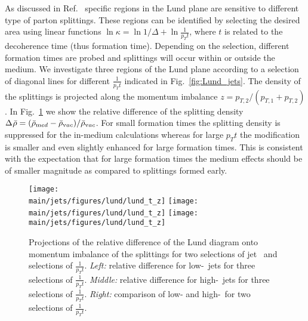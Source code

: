 
As discussed in Ref.~\cite{Andrews:2018jcm} specific regions in the Lund plane are sensitive to different type of parton splittings. 
These regions can be identified by selecting the desired area using linear functions $\ln\kappa = \ln1/\Delta + \ln \frac{1}{p_{T} t}$, where $t$ is related to the decoherence time (thus formation time).
Depending on the selection, different formation times are probed and splittings will occur within or outside the medium.
We investigate three regions of the Lund plane according to a selection of diagonal lines for different $\frac{1}{p_{T} t}$ indicated in Fig.~\ref{fig:Lund_jets}.
The density of the splittings is projected along the momentum imbalance $z = p_{T,2}/(p_{T,1} + p_{T,2})$.
In Fig.~\ref{fig:Lund_projections_z} we show the relative difference of the splitting density $\Delta_{\rm}\bar{\rho} = (\bar{\rho}_{\mathrm med} - \bar{\rho}_{\mathrm vac})/\bar{\rho}_{\mathrm vac}$.
For small formation times the splitting density is suppressed for the in-medium calculations whereas for large $p_{T} t$ the modification is smaller and even slightly enhanced for large formation times.
This is consistent with the expectation that for large formation times the medium effects should be of smaller magnitude as compared to splittings formed early.
%
\begin{figure}[htbp]
	\centering
	\texttt{[image: \\main/jets/figures/lund/lund\_t\_z]}
	\texttt{[image: \\main/jets/figures/lund/lund\_t\_z]}
	\texttt{[image: \\main/jets/figures/lund/lund\_t\_z]}
	\caption{Projections of the relative difference of the Lund diagram onto momentum imbalance of the splittings for two selections of jet \pt\ and selections of $\frac{1}{p_{T} t}$.
	{\it Left:} relative difference for low-\pt\ jets for three selections of $\frac{1}{p_{T} t}$.
	{\it Middle:} relative difference for high-\pt\ jets for three selections of $\frac{1}{p_{T} t}$.
	{\it Right:} comparison of low- and high-\pt\ for two selections of $\frac{1}{p_{T} t}$.
	}
	\label{fig:Lund_projections_z}
\end{figure}





